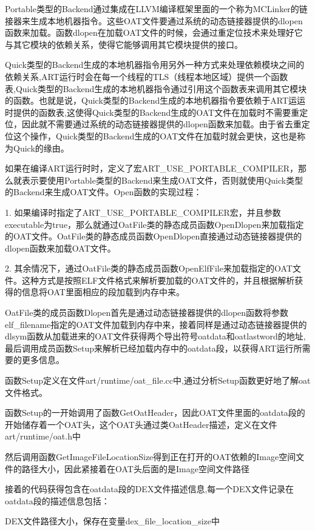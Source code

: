 Portable类型的Backend通过集成在LLVM编译框架里面的一个称为MCLinker的链接器来生成本地机器指令。这些OAT文件要通过系统的动态链接器提供的dlopen函数来加载。函数dlopen在加载OAT文件的时候，会通过重定位技术来处理好它与其它模块的依赖关系，使得它能够调用其它模块提供的接口。

Quick类型的Backend生成的本地机器指令用另外一种方式来处理依赖模块之间的依赖关系,ART运行时会在每一个线程的TLS（线程本地区域）提供一个函数表,Quick类型的Backend生成的本地机器指令通过引用这个函数表来调用其它模块的函数。也就是说，Quick类型的Backend生成的本地机器指令要依赖于ART运运时提供的函数表,这使得Quick类型的Backend生成的OAT文件在加载时不需要重定位，因此就不需要通过系统的动态链接器提供的dlopen函数来加载。由于省去重定位这个操作，Quick类型的Backend生成的OAT文件在加载时就会更快，这也是称为Quick的缘由。

如果在编译ART运行时时，定义了宏ART\_USE\_PORTABLE\_COMPILER，那么就表示要使用Portable类型的Backend来生成OAT文件，否则就使用Quick类型的Backend来生成OAT文件。Open函数的实现过程：

1. 如果编译时指定了ART\_USE\_PORTABLE\_COMPILER宏，并且参数executable为true，那么就通过OatFile类的静态成员函数OpenDlopen来加载指定的OAT文件。OatFile类的静态成员函数OpenDlopen直接通过动态链接器提供的dlopen函数来加载OAT文件。

2. 其余情况下，通过OatFile类的静态成员函数OpenElfFile来加载指定的OAT文件。这种方式是按照ELF文件格式来解析要加载的OAT文件的，并且根据解析获得的信息将OAT里面相应的段加载到内存中来。

OatFile类的成员函数Dlopen首先是通过动态链接器提供的dlopen函数将参数elf\_filename指定的OAT文件加载到内存中来，接着同样是通过动态链接器提供的dlsym函数从加载进来的OAT文件获得两个导出符号oatdata和oatlastword的地址,最后调用成员函数Setup来解析已经加载内存中的oatdata段，以获得ART运行所需要的更多信息。

函数Setup定义在文件art/runtime/oat\_file.cc中,通过分析Setup函数更好地了解oat文件格式。

函数Setup的一开始调用了函数GetOatHeader，因此OAT文件里面的oatdata段的开始储存着一个OAT头，这个OAT头通过类OatHeader描述，定义在文件art/runtime/oat.h中

然后调用函数GetImageFileLocationSize得到正在打开的OAT依赖的Image空间文件的路径大小，因此紧接着在OAT头后面的是Image空间文件路径

接着的代码获得包含在oatdata段的DEX文件描述信息,每一个DEX文件记录在oatdata段的描述信息包括：

DEX文件路径大小，保存在变量dex\_file\_location\_size中

